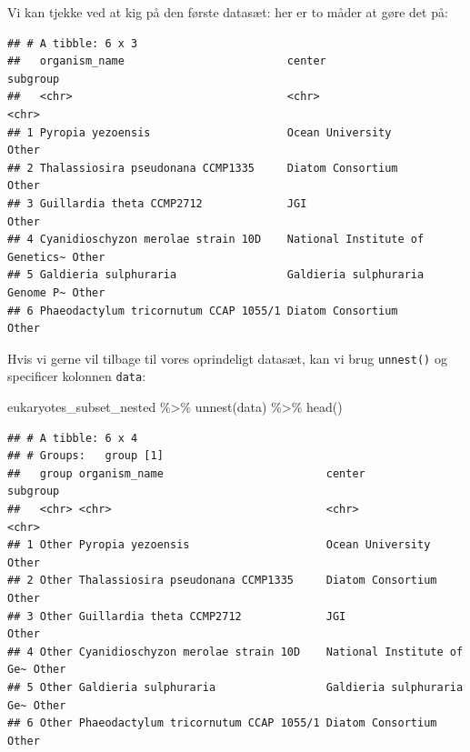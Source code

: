 \documentclass[
]{book}
\newenvironment{Shaded}{\begin{snugshade}}{\end{snugshade}}
\newcommand{\DecValTok}[1]{\textcolor[rgb]{0.00,0.00,0.81}{#1}}
\newcommand{\FunctionTok}[1]{\textcolor[rgb]{0.00,0.00,0.00}{#1}}
\newcommand{\NormalTok}[1]{#1}
\newcommand{\OtherTok}[1]{\textcolor[rgb]{0.56,0.35,0.01}{#1}}
\newcommand{\SpecialCharTok}[1]{\textcolor[rgb]{0.00,0.00,0.00}{#1}}
\newcommand{\StringTok}[1]{\textcolor[rgb]{0.31,0.60,0.02}{#1}}
\begin{document}
Vi kan tjekke ved at kig på den første datasæt: her er to måder at gøre det på:

\begin{Shaded}
\end{Shaded}

\begin{verbatim}
## # A tibble: 6 x 3
##   organism_name                         center                          subgroup
##   <chr>                                 <chr>                           <chr>   
## 1 Pyropia yezoensis                     Ocean University                Other   
## 2 Thalassiosira pseudonana CCMP1335     Diatom Consortium               Other   
## 3 Guillardia theta CCMP2712             JGI                             Other   
## 4 Cyanidioschyzon merolae strain 10D    National Institute of Genetics~ Other   
## 5 Galdieria sulphuraria                 Galdieria sulphuraria Genome P~ Other   
## 6 Phaeodactylum tricornutum CCAP 1055/1 Diatom Consortium               Other
\end{verbatim}

Hvis vi gerne vil tilbage til vores oprindeligt datasæt, kan vi brug \texttt{unnest()} og specificer kolonnen \texttt{data}:

\begin{Shaded}
\begin{Highlighting}[]
\NormalTok{eukaryotes\_subset\_nested }\SpecialCharTok{\%\textgreater{}\%} 
  \FunctionTok{unnest}\NormalTok{(data) }\SpecialCharTok{\%\textgreater{}\%} 
  \FunctionTok{head}\NormalTok{()}
\end{Highlighting}
\end{Shaded}

\begin{verbatim}
## # A tibble: 6 x 4
## # Groups:   group [1]
##   group organism_name                         center                    subgroup
##   <chr> <chr>                                 <chr>                     <chr>   
## 1 Other Pyropia yezoensis                     Ocean University          Other   
## 2 Other Thalassiosira pseudonana CCMP1335     Diatom Consortium         Other   
## 3 Other Guillardia theta CCMP2712             JGI                       Other   
## 4 Other Cyanidioschyzon merolae strain 10D    National Institute of Ge~ Other   
## 5 Other Galdieria sulphuraria                 Galdieria sulphuraria Ge~ Other   
## 6 Other Phaeodactylum tricornutum CCAP 1055/1 Diatom Consortium         Other
\end{verbatim}
\end{document}
